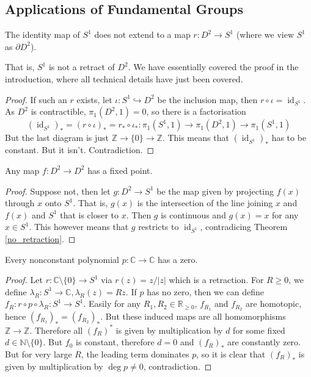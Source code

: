 \subsection{Applications of Fundamental Groups}
\begin{theorem}\label{no_retraction}
    The identity map of $S^1$ does not extend to a map $r:D^2\to S^1$ (where we view $S^1$ as $\partial D^2$).
\end{theorem}
That is, $S^1$ is not a retract of $D^2$.
We have essentially covered the proof in the introduction, where all technical details have just been covered.
\begin{proof}
    If such an $r$ exists, let $\iota:S^1\hookrightarrow D^2$ be the inclusion map, then $r\circ\iota=\operatorname{id}_{S^1}$.
    As $D^2$ is contractible, $\pi_1(D^2,1)=0$, so there is a factorisation
    $$(\operatorname{id}_{S^1})_\ast=(r\circ\iota)_\ast=r_\ast\circ\iota_\ast:\pi_1(S^1,1)\to\pi_1(D^2,1)\to\pi_1(S^1,1)$$
    But the last diagram is just $\mathbb Z\to\{0\}\to\mathbb Z$.
    This means that $(\operatorname{id}_{S^1})_\ast$ has to be constant.
    But it isn't.
    Contradiction.
\end{proof}
\begin{theorem}
    Any map $f:D^2\to D^2$ has a fixed point.
\end{theorem}
\begin{proof}
    Suppose not, then let $g:D^2\to S^1$ be the map given by projecting $f(x)$ through $x$ onto $S^1$.
    That is, $g(x)$ is the intersection of the line joining $x$ and $f(x)$ and $S^1$ that is closer to $x$.
    Then $g$ is continuous and $g(x)=x$ for any $x\in S^1$.
    This however means that $g$ restricts to $\operatorname{id}_{S^1}$, contradicing Theorem \ref{no_retraction}.
\end{proof}
\begin{theorem}
    Every nonconstant polynomial $p:\mathbb C\to\mathbb C$ has a zero.
\end{theorem}
\begin{proof}
    Let $r:\mathbb C\setminus\{0\}\to S^1$ via $r(z)=z/|z|$ which is a retraction.
    For $R\ge 0$, we define $\lambda_R:S^1\to\mathbb C, \lambda_R(z)=Rz$.
    If $p$ has no zero, then we can define $f_R:r\circ p\circ \lambda_R:S^1\to S^1$.
    Easily for any $R_1,R_2\in\mathbb R_{\ge 0}$, $f_{R_1}$ and $f_{R_2}$ are homotopic, hence $(f_{R_1})_\ast=(f_{R_2})_\ast$.
    But these induced maps are all homomorphisms $\mathbb Z\to\mathbb Z$.
    Therefore all $(f_R)^\ast$ is given by multiplication by $d$ for some fixed $d\in\mathbb N\setminus\{0\}$.
    But $f_0$ is constant, therefore $d=0$ and $(f_R)_\ast$ are constantly zero.
    But for very large $R$, the leading term dominates $p$, so it is clear that $(f_R)_\ast$ is given by multiplication by $\deg p\neq 0$, contradiction.
\end{proof}
